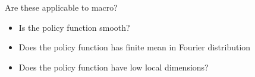 \documentclass[aspectratio=169]{beamer} %
\begin{document}
    

\begin{frame}{Are these applicable to macro?}
    \begin{itemize}
        \item Is the policy function smooth?
        \item Does the policy function has finite mean in Fourier distribution
        \item Does the policy function have low local dimensions?
    \end{itemize}
\end{frame}
\end{document}
